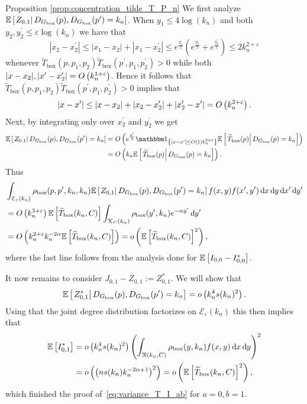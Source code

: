 \begin{proofof}{Proposition \ref{prop:concentration_tilde_T_P_n}}
We first analyze $\mathbb{E}\left[\left.Z_{0,1}\right|D_{G_{\mathrm{box}}}(p), D_{G_{\mathrm{box}}}(p^\prime) = k_n\right]$. When $y_1 \le 4\log(k_n)$ and both $y_2, y_2^\prime \le \varepsilon \log(k_n)$ we have that
\[
	|x_2 - x_2^\prime| \le |x_1 - x_2| + |x_1 - x_2^\prime| \le e^{\frac{y_1}{2}}\left(e^{\frac{y_2}{2}} + e^{\frac{y_2^\prime}{2}}\right) \le 2k_n^{2+\varepsilon}
\]
whenever $\widetilde{T}_{\text{box}}(p,p_1,p_2) \widetilde{T}_{\text{box}}(p^\prime,p_1,p_2^\prime) > 0$ while both $|x - x_2|, |x^\prime - x_2^\prime| = O\left(k_n^{1 + \varepsilon}\right)$. Hence it follows that $\widetilde{T}_{\text{box}}(p,p_1,p_2) \widetilde{T}_{\text{box}}(p^\prime,p_1,p_2^\prime) > 0$ implies that
\[
	|x - x^\prime| \le |x - x_2| + |x_2 - x_2^\prime| + |x_2^\prime - x^\prime| = O\left(k_n^{2 + \varepsilon}\right).
\]
Next, by integrating only over $x_2^\prime$ and $y_2^\prime $ we get
\begin{align*}
	\CExp{Z_{0,1}}{\Dbox(p), \Dbox(p^\prime) = k_n} &=
	\bigO{e^{\frac{y^\prime}{2}}\ind{|x-x^\prime|\le \bigO{1}k_n^{2 + \varepsilon}} 
		\CExp{\widetilde{T}_{\text{box}}(p)}{\Dbox(p) =k_n}}\\
	&= \bigO{k_n \CExp{\widetilde{T}_{\text{box}}(p)}{\Dbox(p) =k_n}}.
\end{align*}
Thus
\begin{align*}
	&\int_{\mathcal{E}_\varepsilon(k_n)} \rho_{\text{box}}(p,p^\prime,k_n,k_n)
		\mathbb{E}\left[\left.Z_{0,1}\right|D_{G_{\mathrm{box}}}(p), D_{G_{\mathrm{box}}}(p^\prime) = k_n\right] f(x,y) f(x^\prime,y^\prime) \operatorname{\mathrm{d}\hspace{-2pt}} x \operatorname{\mathrm{d}\hspace{-2pt}} y \operatorname{\mathrm{d}\hspace{-2pt}} x^\prime \operatorname{\mathrm{d}\hspace{-2pt}} y^\prime\\
	&= O\left(k_n^{3+\varepsilon}\right) \mathbb{E}\left[\widetilde{T}_{\text{box}}(k_n,C)\right] 
		\int_{{\mathcal K}_{C}(k_n)}\rho_{\text{box}}(y^\prime,k_n) e^{-\alpha y^\prime} \operatorname{\mathrm{d}\hspace{-2pt}} y^\prime\\
	&= O\left(k_n^{2+\varepsilon} k_n^{-2\alpha} \mathbb{E}\left[\widetilde{T}_{\text{box}}(k_n,C)\right] \right) 
		= o\left(\mathbb{E}\left[\widetilde{T}_{\text{box}}(k_n,C)\right]^2\right), 
\end{align*}
where the last line follows from the analysis done for $\mathbb{E}\left[I_{0,0}-I_{0,0}^\ast\right]$.

It now remains to consider $J_{0,1} - Z_{0,1} := Z_{0,1}^\ast$. We will show that 
\begin{equation}\label{eq:expectation_J01}
	\mathbb{E}\left[\left.Z_{0,1}^\ast\right|D_{G_{\mathrm{box}}}(p), D_{G_{\mathrm{box}}}(p^\prime) = k_n\right] = o\left(k_n^4 s(k_n)^2\right).
\end{equation} 
Using that the joint degree distribution factorizes on $\mathcal{E}_\varepsilon(k_n)$ this then implies that
\begin{align*}
	\mathbb{E}\left[I_{0,1}^\ast\right]
	&= o\left(k_n^4 s(k_n)^2\right) \left(\int_{{\mathcal R}(k_n,C)} \rho_{\text{box}}(y,k_n) f(x,y) \operatorname{\mathrm{d}\hspace{-2pt}} x \operatorname{\mathrm{d}\hspace{-2pt}} y \right)^2\\ 
	&= o\left(\left(n s(k_n) k_n^{-2\alpha + 1}\right)^2\right) = o\left(\mathbb{E}\left[\widetilde{T}_{\text{box}}(k_n,C)\right]^2\right),
\end{align*}
which finished the proof of~\eqref{eq:variance_T_I_ab} for $a = 0, b = 1$.


\end{proofof}
